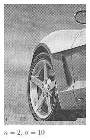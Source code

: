 \documentclass[
	12pt, %
]{style/fphw}
\begin{document}
\begin{figure}[H]
\begin{subfigure}[b]{.22\textwidth}
             \includegraphics[width=\textwidth]{plots2/Q5_3_2_10.png}
             \caption{$n=2$, $\sigma=10$}
             \label{Q5_3_2_10}
         \end{subfigure}
         \hfill
         \begin{subfigure}[b]{.22\textwidth}
             \centering

\end{subfigure}
\end{figure}
\end{document}
